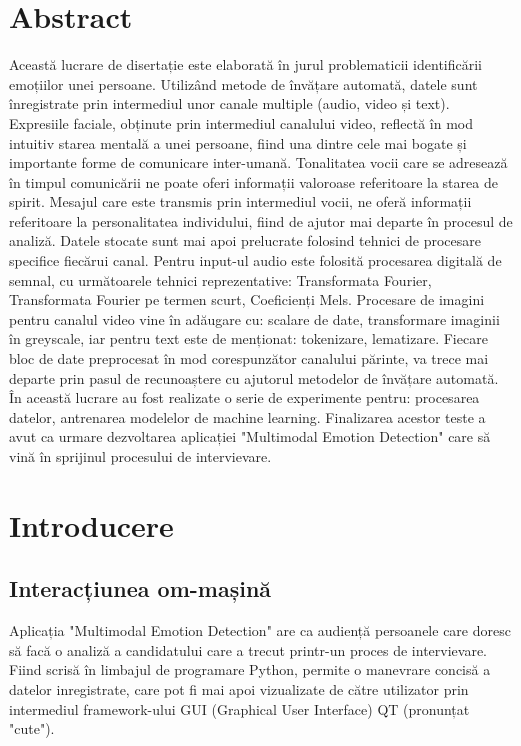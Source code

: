 \documentclass[a4paper, 12pt]{report}
\begin{document}
	
	
	
	\newpage
	\tableofcontents
	\newpage
	\section{Abstract}	
	Această lucrare de disertație este elaborată în jurul problematicii identificării emoțiilor unei persoane. Utilizând metode de învățare automată, datele sunt înregistrate prin intermediul unor canale multiple (audio, video și text). Expresiile faciale, obținute prin intermediul canalului video, reflectă în mod intuitiv starea mentală a unei persoane, fiind una dintre cele mai bogate și importante forme de comunicare inter-umană. Tonalitatea vocii care se adresează în timpul comunicării ne poate oferi informații valoroase referitoare la starea de spirit. Mesajul care este transmis prin intermediul vocii, ne oferă informații referitoare la personalitatea individului, fiind de ajutor mai departe în procesul de analiză.
	Datele stocate sunt mai apoi prelucrate folosind tehnici de procesare specifice fiecărui canal. Pentru input-ul audio este folosită procesarea digitală de semnal, cu următoarele tehnici reprezentative: Transformata Fourier, Transformata Fourier pe termen scurt, Coeficienți Mels. Procesare de imagini pentru canalul video vine în adăugare cu: scalare de date, transformare imaginii în greyscale, iar pentru text este de menționat: tokenizare, lematizare. Fiecare bloc de date preprocesat în mod corespunzător canalului părinte, va trece mai departe prin pasul de recunoaștere cu ajutorul metodelor de învățare automată.
	În această lucrare au fost realizate o serie de experimente pentru: procesarea datelor, antrenarea modelelor de machine learning. Finalizarea acestor teste a avut ca urmare dezvoltarea aplicației "Multimodal Emotion Detection" care să vină în sprijinul procesului de intervievare.
	\clearpage
	
	\section{Introducere}
	\subsection{Interacțiunea om-mașină}
	Aplicația "Multimodal Emotion Detection" are ca audiență persoanele care doresc să facă o analiză a candidatului care a trecut printr-un proces de intervievare. Fiind scrisă în limbajul de programare Python, permite o manevrare concisă a datelor inregistrate, care pot fi mai apoi vizualizate de către utilizator prin intermediul framework-ului GUI (Graphical User Interface) QT (pronunțat "cute"). 
	
\end{document}
